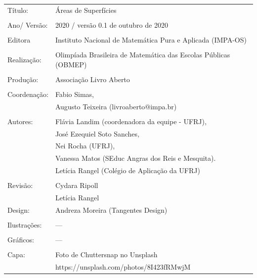 \begin{tabular}{p{}p{}}
Título: & Áreas de Superfícies\\
\\
Ano/ Versão: & 2020 / versão 0.1 de outubro de 2020\\
\\
Editora & Instituto Nacional de Matem\'atica Pura e Aplicada (IMPA-OS)\\
\\
Realização:& Olimp\'iada Brasileira de Matem\'atica das Escolas P\'ublicas (OBMEP)\\
\\
Produção:& Associação Livro Aberto\\
\\
Coordenação: & Fabio Simas, \\
             & Augusto Teixeira (livroaberto@impa.br)\\
\\
  Autores: & Flávia Landim (coordenadora da equipe - UFRJ),\\
        & José Ezequiel Soto Sanches,\\
        & Nei Rocha (UFRJ),\\
             & Vanessa Matos (SEduc Angras dos Reis e Mesquita).\\
             & Letícia Rangel (Colégio de Aplicação da UFRJ)\\
\\
Revisão: &  Cydara Ripoll  \\
		 &  Letícia Rangel
\\
Design: & Andreza Moreira (Tangentes Design) \\
\\
  Ilustrações: & --- \\ 
\\
Gráficos: & ---\\
\\
  Capa: & Foto de Chuttersnap no Unsplash \\
        & https://unsplash.com/photos/8I423fRMwjM \\

\end{tabular}



